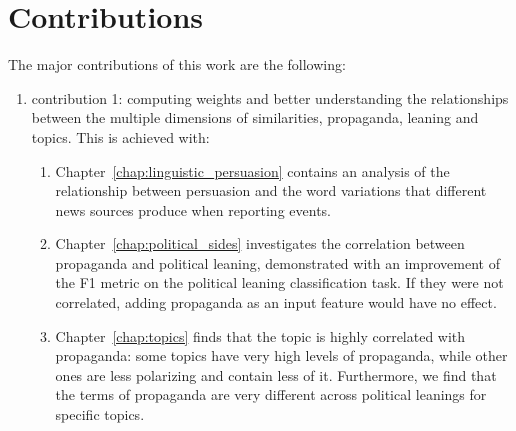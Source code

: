 \section{\statusgreen Contributions}
\label{sec:intro_contributions}

The major contributions of this work are the following:
\begin{enumerate}
    \item contribution 1: computing weights and better understanding the relationships between the multiple dimensions of similarities, propaganda, leaning and topics. This is achieved with:
    \begin{enumerate}
        \item Chapter~\ref{chap:linguistic_persuasion} contains an analysis of the relationship between persuasion and the word variations that different news sources produce when reporting events.
        \item Chapter~\ref{chap:political_sides} investigates the correlation between propaganda and political leaning, demonstrated with an improvement of the F1 metric on the political leaning classification task. If they were not correlated, adding propaganda as an input feature would have no effect.
        \item Chapter~\ref{chap:topics} finds that the topic is highly correlated with propaganda: some topics have very high levels of propaganda, while other ones are less polarizing and contain less of it. Furthermore, we find that the terms of propaganda are very different across political leanings for specific topics. %
        

\end{enumerate}
\end{enumerate}
